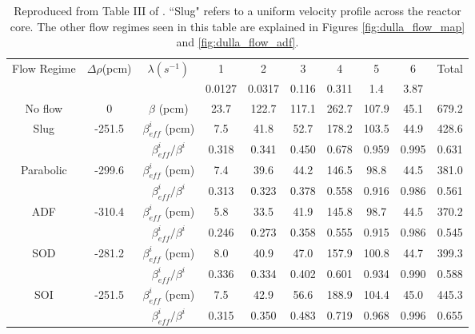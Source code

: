 \documentclass[review]{elsarticle}
\begin{document}
\begin{table}[h]
    \caption{Reproduced from Table III of \cite{dulla_interactions_2007}. 
    ``Slug"
        refers to a uniform velocity profile across the reactor core.
        The other flow regimes seen in this table are explained in
        Figures \ref{fig:dulla_flow_map} and \ref{fig:dulla_flow_adf}.} 
    \label{tbl:dulla_flow_regimes_beta}
    \begin{center}
        \begin{tabular}{|c|c|c|c|c|c|c|c|c|c|}
            \hline
            \multirow{2}{*}{Flow Regime} & \multirow{2}{*}{$\Delta \rho$(pcm)}
            &\multirow{2}{*}{$\lambda(s^{-1})$}&1 & 2 & 3 & 4 & 5 & 6 &
             \multirow{2}{*}{Total} \\
            \cline{4 - 9}
            & & & 0.0127 & 0.0317 & 0.116 & 0.311 & 1.4 & 3.87 & \\
            \hline
            No flow & 0 & $\beta$ (pcm) & 23.7 & 122.7 & 117.1 & 262.7 & 107.9 &
                45.1 & 679.2 \\
            \hline
            Slug & -251.5 & $\beta_{eff}^{i}$ (pcm) & 7.5 & 41.8 & 52.7 & 178.2&
                 103.5 & 44.9 & 428.6 \\
            & & $\beta_{eff}^{i}/\beta^{i}$ & 0.318 & 0.341 & 0.450 & 0.678 &
                0.959 & 0.995 & 0.631 \\
            \hline
            Parabolic & -299.6 & $\beta_{eff}^{i}$ (pcm) & 7.4 & 39.6 & 44.2 &
                146.5 & 98.8 & 44.5 & 381.0 \\
            & & $\beta_{eff}^{i}/\beta^{i}$ & 0.313 & 0.323 & 0.378 & 0.558 &
                0.916 & 0.986 & 0.561 \\
            \hline
            ADF & -310.4 & $\beta_{eff}^{i}$ (pcm) & 5.8 & 33.5 & 41.9 & 145.8 &
                 98.7 & 44.5 & 370.2 \\
            & & $\beta_{eff}^{i}/\beta^{i}$ & 0.246 & 0.273 & 0.358 & 0.555 &
                0.915 & 0.986 & 0.545 \\
            \hline
            SOD & -281.2 & $\beta_{eff}^{i}$ (pcm) & 8.0 & 40.9 & 47.0 & 157.9 &
                100.8 & 44.7 & 399.3 \\
            & & $\beta_{eff}^{i}/\beta^{i}$ & 0.336 & 0.334 & 0.402 & 0.601 &
                0.934 & 0.990 & 0.588 \\
            \hline
            SOI & -251.5 & $\beta_{eff}^{i}$ (pcm) & 7.5 & 42.9 & 56.6 & 188.9 &
                104.4 & 45.0 & 445.3 \\
            & & $\beta_{eff}^{i}/\beta^{i}$ & 0.315 & 0.350 & 0.483 & 0.719 &
                0.968 & 0.996 & 0.655 \\
            \hline
        \end{tabular}
    \end{center}
\end{table}
\end{document}
